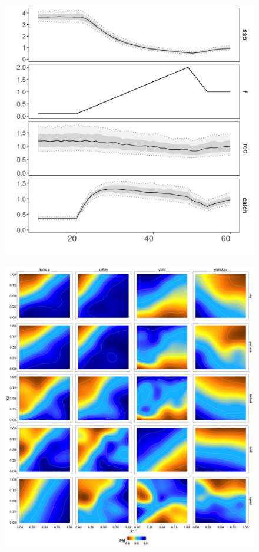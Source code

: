 \documentclass[preprint,review,12pt]{elsarticle}
\begin{document}
\begin{figure}[]\centering\includegraphics[width=5in]{fig4.png}\caption{}\label{fig:fig4}\end{figure}
\begin{figure}[]\centering\includegraphics[width=5in]{fig5.png}\caption{}\label{fig:fig5}\end{figure}
\end{document}
